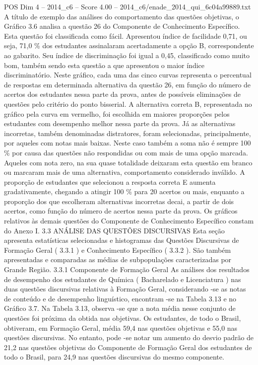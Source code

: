 \begin{textsample}{POS Dim 4 – 2014\_c6 – Score 4.00 – 2014\_c6/enade\_2014\_qui\_6c04a99889.txt}
A título de exemplo das análises do comportamento das questões objetivas, o Gráfico 3.6 analisa a questão 26 do Componente de Conhecimento Específico.
Esta questão foi classificada como fácil.
Apresentou índice de facilidade 0,71, ou seja, 71,0 \% dos estudantes assinalaram acertadamente a opção B, correspondente ao gabarito.
Seu índice de discriminação foi igual a 0,45, classificado como muito bom, também sendo esta questão a que apresentou o maior índice discriminatório.
Neste gráfico, cada uma das cinco curvas representa o percentual de respostas em determinada alternativa da questão 26, em função do número de acertos dos estudantes nessa parte da prova, antes de possíveis eliminações de questões pelo critério do ponto bisserial.
A alternativa correta B, representada no gráfico pela curva em vermelho, foi escolhida em maiores proporções pelos estudantes com desempenho melhor nessa parte da prova.
Já as alternativas incorretas, também denominadas distratores, foram selecionadas, principalmente, por aqueles com notas mais baixas.
Neste caso também a soma não é sempre 100 \% por causa das questões não respondidas ou com mais de uma opção marcada.
Aqueles com nota zero, na sua quase totalidade deixaram esta questão em branco ou marcaram mais de uma alternativa, comportamento considerado inválido.
A proporção de estudantes que selecionou a resposta correta E aumenta gradativamente, chegando a atingir 100 \% para 20 acertos ou mais, enquanto a proporção dos que escolheram alternativas incorretas decai, a partir de dois acertos, como função do número de acertos nessa parte da prova.
Os gráficos relativos às demais questões do Componente de Conhecimento Específico constam do Anexo I. 3.3 ANÁLISE DAS QUESTÕES DISCURSIVAS Esta seção apresenta estatísticas selecionadas e histogramas das Questões Discursivas de Formação Geral ( 3.3.1 ) e Conhecimento Específico ( 3.3.2 ).
São também apresentadas e comparadas as médias de subpopulações caracterizadas por Grande Região. 3.3.1 Componente de Formação Geral As análises dos resultados de desempenho dos estudantes de Química ( Bacharelado e Licenciatura ) nas duas questões discursivas relativas à Formação Geral, considerando -se as notas de conteúdo e de desempenho linguístico, encontram -se na Tabela 3.13 e no Gráfico 3.7.
Na Tabela 3.13, observa -se que a nota média nesse conjunto de questões foi próxima da obtida nas objetivas.
Os estudantes, de todo o Brasil, obtiveram, em Formação Geral, média 59,4 nas questões objetivas e 55,0 nas questões discursivas.
No entanto, pode -se notar um aumento do desvio padrão de 21,2 nas questões objetivas do Componente de Formação Geral dos estudantes de todo o Brasil, para 24,9 nas questões discursivas do mesmo componente.

\end{textsample}
